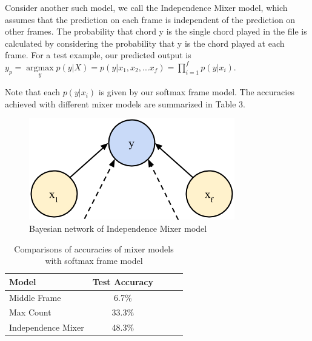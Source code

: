 \documentclass{article}
\begin{document}
Consider another such model, we call the Independence Mixer model, which assumes
that the prediction on each frame is independent of the prediction on other
frames. The probability that chord y is the single chord played in the file is
calculated by considering the probability that y is the chord played at each
frame. For a test example, our predicted output is $y_p =
\underset{y}{\operatorname{argmax}} p(y | X) = p(y | x_1, x_2, ... x_f) =
\prod_{i=1}^fp(y | x_i)$.

Note that each $p(y | x_i)$ is given by our softmax frame model. The accuracies
achieved with different mixer models are summarized in Table 3.
\begin{figure}[ht]
\vskip 0.2in
\begin{center}
\centerline{\includegraphics[width=\columnwidth]{naive}}
\caption{Bayesian network of Independence Mixer model}
\label{icml-historical}
\end{center}
\vskip -0.2in
\end{figure}

\begin{table}[t]
\caption{Comparisons of accuracies of mixer models with softmax frame model}
\label{mfccvschroma}
\vskip 0.15in
\begin{center}
\begin{small}
\begin{sc}
\begin{tabular}{lcccr}
\hline
\abovespace\belowspace
Model & Test Accuracy \\
\hline
\abovespace
Middle Frame & 6.7\%\\
Max Count & 33.3\%\\
Independence Mixer & 48.3\%\\
\hline
\end{tabular}
\end{sc}
\end{small}
\end{center}
\vskip -0.1in
\end{table}
\end{document}
